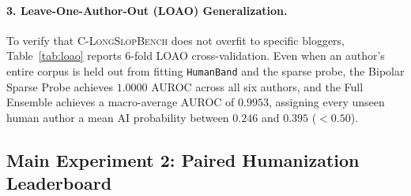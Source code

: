 \documentclass[11pt]{article}
\newcommand{\bench}{\textsc{C-LongSlopBench}}
\begin{document}
\paragraph{3. Leave-One-Author-Out (LOAO) Generalization.}
To verify that \bench{} does not overfit to specific bloggers, Table~\ref{tab:loao} reports 6-fold LOAO cross-validation. Even when an author's entire corpus is held out from fitting \texttt{HumanBand} and the sparse probe, the Bipolar Sparse Probe achieves $1.0000$ AUROC across all six authors, and the Full Ensemble achieves a macro-average AUROC of \textbf{$0.9953$}, assigning every unseen human author a mean AI probability between $0.246$ and $0.395$ ($<0.50$).

\subsection{Main Experiment 2: Paired Humanization Leaderboard}
\end{document}
